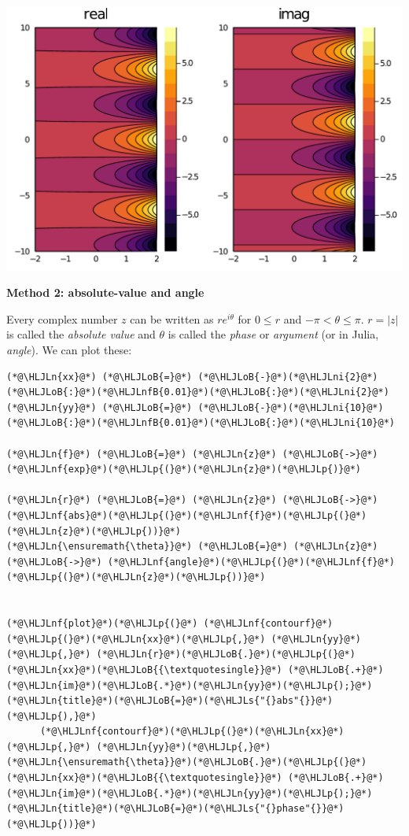 \documentclass[12pt,a4paper]{article}
\newcommand{\HLJLn}[1]{#1}
\newcommand{\HLJLnf}[1]{\textcolor[RGB]{66,102,213}{#1}}
\newcommand{\HLJLs}[1]{\textcolor[RGB]{201,61,57}{#1}}
\newcommand{\HLJLnfB}[1]{\textcolor[RGB]{59,151,46}{#1}}
\newcommand{\HLJLni}[1]{\textcolor[RGB]{59,151,46}{#1}}
\newcommand{\HLJLoB}[1]{\textcolor[RGB]{102,102,102}{\textbf{#1}}}
\newcommand{\HLJLp}[1]{#1}
\begin{document}
\includegraphics[width=\linewidth]{jl_z7eR69/Lecture1_2_1.pdf}

\textbf{Method 2: absolute-value and angle}

Every complex number $z$ can be written as $re^{i \theta}$ for $0 \leq r$ and $-\pi < \theta \leq \pi$. $r = |z|$ is called the \emph{absolute value} and $\theta$ is called the \emph{phase} or \emph{argument} (or in Julia, \emph{angle}).  We can plot these:


\begin{lstlisting}
(*@\HLJLn{xx}@*) (*@\HLJLoB{=}@*) (*@\HLJLoB{-}@*)(*@\HLJLni{2}@*)(*@\HLJLoB{:}@*)(*@\HLJLnfB{0.01}@*)(*@\HLJLoB{:}@*)(*@\HLJLni{2}@*)
(*@\HLJLn{yy}@*) (*@\HLJLoB{=}@*) (*@\HLJLoB{-}@*)(*@\HLJLni{10}@*)(*@\HLJLoB{:}@*)(*@\HLJLnfB{0.01}@*)(*@\HLJLoB{:}@*)(*@\HLJLni{10}@*)

(*@\HLJLn{f}@*) (*@\HLJLoB{=}@*) (*@\HLJLn{z}@*) (*@\HLJLoB{->}@*) (*@\HLJLnf{exp}@*)(*@\HLJLp{(}@*)(*@\HLJLn{z}@*)(*@\HLJLp{)}@*)

(*@\HLJLn{r}@*) (*@\HLJLoB{=}@*) (*@\HLJLn{z}@*) (*@\HLJLoB{->}@*) (*@\HLJLnf{abs}@*)(*@\HLJLp{(}@*)(*@\HLJLnf{f}@*)(*@\HLJLp{(}@*)(*@\HLJLn{z}@*)(*@\HLJLp{))}@*)
(*@\HLJLn{\ensuremath{\theta}}@*) (*@\HLJLoB{=}@*) (*@\HLJLn{z}@*) (*@\HLJLoB{->}@*) (*@\HLJLnf{angle}@*)(*@\HLJLp{(}@*)(*@\HLJLnf{f}@*)(*@\HLJLp{(}@*)(*@\HLJLn{z}@*)(*@\HLJLp{))}@*)


(*@\HLJLnf{plot}@*)(*@\HLJLp{(}@*) (*@\HLJLnf{contourf}@*)(*@\HLJLp{(}@*)(*@\HLJLn{xx}@*)(*@\HLJLp{,}@*) (*@\HLJLn{yy}@*)(*@\HLJLp{,}@*) (*@\HLJLn{r}@*)(*@\HLJLoB{.}@*)(*@\HLJLp{(}@*)(*@\HLJLn{xx}@*)(*@\HLJLoB{{\textquotesingle}}@*) (*@\HLJLoB{.+}@*) (*@\HLJLn{im}@*)(*@\HLJLoB{.*}@*)(*@\HLJLn{yy}@*)(*@\HLJLp{);}@*) (*@\HLJLn{title}@*)(*@\HLJLoB{=}@*)(*@\HLJLs{"{}abs"{}}@*)(*@\HLJLp{),}@*)
      (*@\HLJLnf{contourf}@*)(*@\HLJLp{(}@*)(*@\HLJLn{xx}@*)(*@\HLJLp{,}@*) (*@\HLJLn{yy}@*)(*@\HLJLp{,}@*) (*@\HLJLn{\ensuremath{\theta}}@*)(*@\HLJLoB{.}@*)(*@\HLJLp{(}@*)(*@\HLJLn{xx}@*)(*@\HLJLoB{{\textquotesingle}}@*) (*@\HLJLoB{.+}@*) (*@\HLJLn{im}@*)(*@\HLJLoB{.*}@*)(*@\HLJLn{yy}@*)(*@\HLJLp{);}@*) (*@\HLJLn{title}@*)(*@\HLJLoB{=}@*)(*@\HLJLs{"{}phase"{}}@*)(*@\HLJLp{))}@*)
\end{lstlisting}
\end{document}
